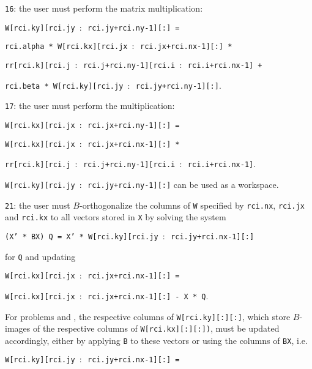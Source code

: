 \begin{description}
\begin{description}
%
\item
{\tt 16}: the user must perform the matrix multiplication:

\hspace{8mm}
{\tt W[rci.ky][rci.jy $:$ rci.jy+rci.ny-1][:] =}

\hspace{12mm}
{\tt rci.alpha *
W[rci.kx][rci.jx $:$ rci.jx+rci.nx-1][:] *}

\hspace{16mm}
{\tt rr[rci.k][rci.j $:$ rci.j+rci.ny-1][rci.i $:$ rci.i+rci.nx-1] + }

\hspace{12mm}
{\tt rci.beta * W[rci.ky][rci.jy $:$ rci.jy+rci.ny-1][:]}.
%
\item
{\tt 17}: the user must perform the multiplication:


\hspace{8mm}
{\tt W[rci.kx][rci.jx $:$ rci.jx+rci.ny-1][:] =}

\hspace{12mm}
{\tt W[rci.kx][rci.jx $:$ rci.jx+rci.nx-1][:] *}

\hspace{16mm}
{\tt rr[rci.k][rci.j $:$ rci.j+rci.ny-1][rci.i $:$ rci.i+rci.nx-1]}.

{\tt W[rci.ky][rci.jy $:$ rci.jy+rci.ny-1][:]}
can be used as a workspace.
%
\item
{\tt 21}: 
the user must $B$-orthogonalize
the columns of {\tt W} specified by
{\tt rci.nx}, {\tt rci.jx} and {\tt rci.kx} 
to all vectors stored in {\tt X}
by solving the system

\hspace{8mm}
{\tt (X' * BX) Q = X' * W[rci.ky][rci.jy $:$ rci.jy+rci.nx-1][:]}

for {\tt Q} and updating

\hspace{8mm}
{\tt W[rci.kx][rci.jx $:$ rci.jx+rci.nx-1][:] =}

\hspace{12mm}
{\tt W[rci.kx][rci.jx $:$ rci.jx+rci.nx-1][:] - X * Q}.

For problems  and ,
the respective columns of {\tt W[rci.ky][:][:]},
which store $B$-images of the respective columns of {\tt W[rci.kx][:][:])},
must be updated
accordingly, either by applying {\tt B} to these vectors
or using the columns of {\tt BX}, i.e.

\hspace{8mm}
{\tt W[rci.ky][rci.jy $:$ rci.jy+rci.nx-1][:] =}


\end{description}
\end{description}
